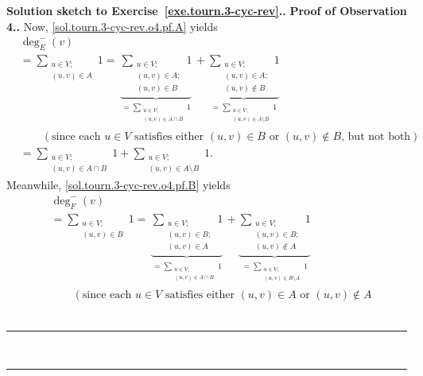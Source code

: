 \documentclass[numbers=enddot,12pt,final,onecolumn,notitlepage]{scrartcl}%
\theoremstyle{definition}
\newenvironment{proof}[1][Proof]{\noindent\textbf{#1.} }{\ \rule{0.5em}{0.5em}}
\let\sumnonlimits\sum
\renewcommand{\sum}{\sumnonlimits\limits}
\newcommand{\tup}[1]{\left( #1 \right)}
\newcommand{\underbrack}[2]{\underbrace{#1}_{\substack{#2}}}
\begin{document}
\begin{proof}[Solution sketch to Exercise~\ref{exe.tourn.3-cyc-rev}.]
\begin{proof}[Proof of Observation 4.]
Now, \eqref{sol.tourn.3-cyc-rev.o4.pf.A} yields
\begin{align}
& \deg^-_E \tup{v} \nonumber \\
&= \sum_{\substack{u \in V;\\ \tup{u, v} \in A}} 1
=
\underbrack{\sum_{\substack{u \in V;\\ \tup{u, v} \in A;\\
                                \tup{u, v} \in B}} 1}
           {= \sum_{\substack{u \in V;\\ \tup{u, v} \in A \cap B}} 1}
+
\underbrack{\sum_{\substack{u \in V;\\ \tup{u, v} \in A;\\
                                \tup{u, v} \notin B}} 1}
           {= \sum_{\substack{u \in V;\\ \tup{u, v} \in A \setminus
                                B}} 1} \nonumber \\
& \qquad \left(\text{since each } u \in V \text{ satisfies either }
                \tup{u, v} \in B \text{ or } \tup{u, v} \notin B
                \text{, but not both}\right) \nonumber \\
&= \sum_{\substack{u \in V;\\ \tup{u, v} \in A \cap B}} 1
   + \sum_{\substack{u \in V;\\ \tup{u, v} \in A \setminus B}} 1 .
\label{sol.tourn.3-cyc-rev.o4.pf.A2}
\end{align}
Meanwhile, \eqref{sol.tourn.3-cyc-rev.o4.pf.B} yields
\begin{align}
& \deg^-_F \tup{v} \nonumber \\
&= \sum_{\substack{u \in V;\\ \tup{u, v} \in B}} 1
=
\underbrack{\sum_{\substack{u \in V;\\ \tup{u, v} \in B;\\
                                \tup{u, v} \in A}} 1}
           {= \sum_{\substack{u \in V;\\ \tup{u, v} \in A \cap B}} 1}
+
\underbrack{\sum_{\substack{u \in V;\\ \tup{u, v} \in B;\\
                                \tup{u, v} \notin A}} 1}
           {= \sum_{\substack{u \in V;\\ \tup{u, v} \in B \setminus
                                A}} 1} \nonumber \\
& \qquad \left(\text{since each } u \in V \text{ satisfies either }
                \tup{u, v} \in A \text{ or } \tup{u, v} \notin A

\end{align}
\end{proof}
\end{proof}
\end{document}
